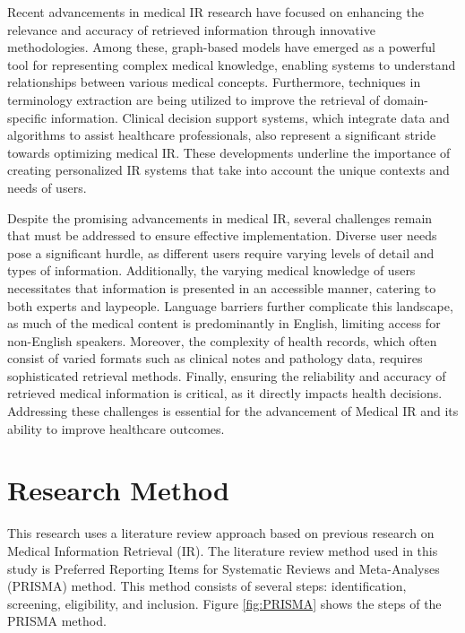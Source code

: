 \documentclass[conference]{IEEEtran}
\begin{document}
Recent advancements in medical IR research have focused on enhancing the relevance and accuracy of retrieved information through innovative methodologies. Among these, graph-based models have emerged as a powerful tool for representing complex medical knowledge, enabling systems to understand relationships between various medical concepts. Furthermore, techniques in terminology extraction are being utilized to improve the retrieval of domain-specific information. Clinical decision support systems, which integrate data and algorithms to assist healthcare professionals, also represent a significant stride towards optimizing medical IR. These developments underline the importance of creating personalized IR systems that take into account the unique contexts and needs of users.

Despite the promising advancements in medical IR, several challenges remain that must be addressed to ensure effective implementation. Diverse user needs pose a significant hurdle, as different users require varying levels of detail and types of information. Additionally, the varying medical knowledge of users necessitates that information is presented in an accessible manner, catering to both experts and laypeople. Language barriers further complicate this landscape, as much of the medical content is predominantly in English, limiting access for non-English speakers. Moreover, the complexity of health records, which often consist of varied formats such as clinical notes and pathology data, requires sophisticated retrieval methods. Finally, ensuring the reliability and accuracy of retrieved medical information is critical, as it directly impacts health decisions. Addressing these challenges is essential for the advancement of Medical IR and its ability to improve healthcare outcomes.

\section{Research Method}

This research uses a literature review approach based on previous research on Medical Information Retrieval (IR). The literature review method used in this study is Preferred Reporting Items for Systematic Reviews and Meta-Analyses (PRISMA) method. This method consists of several steps: identification, screening, eligibility, and inclusion. Figure \ref{fig:PRISMA} shows the steps of the PRISMA method.
\end{document}
